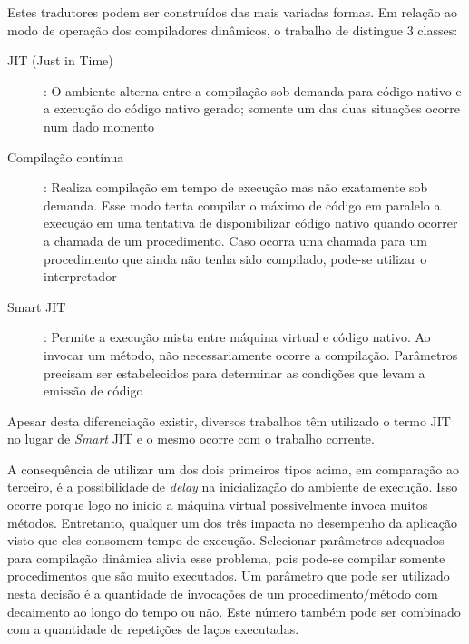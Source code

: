 Estes tradutores podem ser construídos das mais variadas formas.
Em relação ao modo de operação dos compiladores dinâmicos, o trabalho
de  distingue 3 classes:
\begin{description}
  \item[JIT (Just in Time)]: O ambiente alterna entre a compilação sob
    demanda para código nativo e a execução do código nativo gerado;
    somente um das duas situações ocorre num dado momento
  \item[Compilação contínua]: Realiza compilação em tempo de execução
    mas não exatamente sob demanda. Esse modo tenta compilar o máximo
    de código em paralelo a execução em uma tentativa de disponibilizar
    código nativo quando ocorrer a chamada de um procedimento. Caso
    ocorra uma chamada para um procedimento que ainda não tenha sido
    compilado, pode-se utilizar o interpretador
  \item[Smart JIT]: Permite a execução mista entre máquina virtual e
    código nativo. Ao invocar um método, não necessariamente ocorre a
    compilação. Parâmetros precisam ser estabelecidos para determinar
    as condições que levam a emissão de código
\end{description}
Apesar desta diferenciação existir, diversos trabalhos
\cite{suganuma_oopsla_2001}\cite{suganuma_ibm}\cite{judo} têm utilizado o termo
JIT no lugar de \textit{Smart} JIT e o mesmo ocorre com o trabalho
corrente.

A consequência de utilizar um dos dois primeiros tipos acima, em
comparação ao terceiro, é a possibilidade de \textit{delay} na
inicialização do ambiente de execução. Isso ocorre porque logo
no inicio a máquina virtual possivelmente invoca muitos métodos.
Entretanto, qualquer um dos três
impacta no desempenho da aplicação visto que eles consomem tempo
de execução. Selecionar parâmetros adequados para compilação dinâmica
alivia esse problema, pois pode-se compilar somente procedimentos que
são muito executados. Um parâmetro que pode ser utilizado nesta
decisão é a quantidade de invocações de um
procedimento/método com decaimento ao longo do tempo \cite{holzle} ou
não. Este número também pode ser combinado com a quantidade de
repetições de laços executadas.

